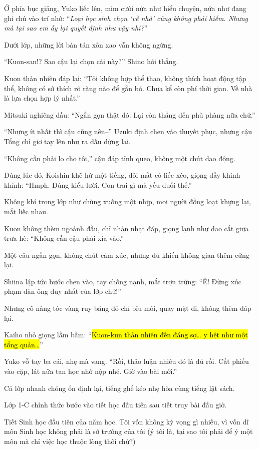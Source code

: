 \documentclass[../main.tex]{subfiles}
\begin{document}
Ở phía bục giảng, Yuko liếc lên, mỉm cười nửa như hiểu chuyện, nửa như đang ghi chú vào trí nhớ: ``\textit{Loại học sinh chọn `về nhà' cũng không phải hiếm. Nhưng mà tại sao em ấy lại quyết định như vậy nhỉ?}''

Dưới lớp, những lời bàn tán xôn xao vẫn không ngừng.

``Kuon-san!? Sao cậu lại chọn cái này?'' Shino hỏi thẳng.

Kuon thản nhiên đáp lại: ``Tôi không hợp thể thao, không thích hoạt động tập thể, không có sở thích rõ ràng nào để gắn bó. Chưa kể còn phí thời gian. Về nhà là lựa chọn hợp lý nhất.''

Mitsuki nghiêng đầu: ``Ngắn gọn thật đó. Lại còn thẳng đến phũ phàng nữa chứ.''

``Nhưng ít nhất thì cậu cũng nên--'' Uzuki định chen vào thuyết phục, nhưng cậu Tổng chỉ giơ tay lên như ra dấu dừng lại.

``Không cần phải lo cho tôi,'' cậu đáp tỉnh queo, không một chút dao động.

Đúng lúc đó, Koishin khẽ hừ một tiếng, đôi mắt cô liếc xéo, giọng đầy khinh khỉnh: ``Hmph. Đúng kiểu lười. Con trai gì mà yếu đuối thế.''

Không khí trong lớp như chùng xuống một nhịp, mọi người đồng loạt khựng lại, mắt liếc nhau.

Kuon không thèm ngoảnh đầu, chỉ nhàn nhạt đáp, giọng lạnh như dao cắt giữa trưa hè: ``Không cần cậu phải xía vào.''

Một câu ngắn gọn, không chút cảm xúc, nhưng đủ khiến không gian thêm cứng lại.

Shiina lập tức bước chen vào, tay chống nạnh, mắt trợn trừng: ``Ê! Đừng xúc phạm đàn ông duy nhất của lớp chứ!''

Nhưng cô nàng tóc vàng ruy băng đỏ chỉ bĩu môi, quay mặt đi, không thèm đáp lại.

Kaiho nhỏ giọng lầm bầm: ``\hl{Kuon-kun thản nhiên đến đáng sợ\dots{} y hệt như một tổng quản\dots}''

Yuko vỗ tay ba cái, nhẹ mà vang. ``Rồi, thảo luận nhiêu đó là đủ rồi. Cất phiếu vào cặp, lát nữa tan học nhớ nộp nhé. Giờ vào bài mới.''

Cả lớp nhanh chóng ổn định lại, tiếng ghế kéo nhẹ hòa cùng tiếng lật sách.

Lớp 1-C chính thức bước vào tiết học đầu tiên sau tiết truy bài đầu giờ.

\ct


Tiết Sinh học đầu tiên của năm học. Tôi vốn không kỳ vọng gì nhiều, vì vốn dĩ môn Sinh học không phải là sở trường của tôi (ý tôi là, tại sao tôi phải để ý một môn mà chỉ việc học thuộc lòng thôi chứ?)
\end{document}
